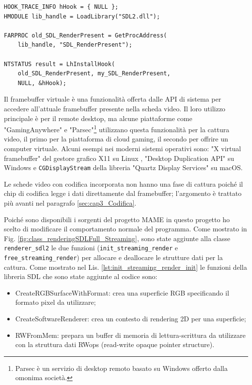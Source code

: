 \begin{lstlisting}[caption=Codice di esempio per hook della libreria SDL, label={lst:hookCode}]
HOOK_TRACE_INFO hHook = { NULL };
HMODULE lib_handle = LoadLibrary("SDL2.dll");

FARPROC old_SDL_RenderPresent =	GetProcAddress(
	lib_handle, "SDL_RenderPresent");

NTSTATUS result = LhInstallHook(
	old_SDL_RenderPresent, my_SDL_RenderPresent,
	NULL, &hHook);
\end{lstlisting}

Il framebuffer virtuale è una funzionalità offerta dalle API di sistema per accedere all'attuale framebuffer presente nella scheda video. Il loro utilizzo principale è per il remote desktop, ma alcune piattaforme come "GamingAnywhere" \parencite{GamingAnywhere} e "Parsec"\footnote{Parsec è un servizio di desktop remoto basato su Windows offerto dalla omonima società.} \parencite{TheTechnologyBehindALowLatencyCloudGamingService} utilizzano questa funzionalità per la cattura video, il primo per la piattaforma di cloud gaming, il secondo per offrire un computer virtuale. Alcuni esempi nei moderni sistemi operativi sono: "X virtual framebuffer" del gestore grafico X11 su Linux \parencite{XVFB}, "Desktop Duplication API" su Windows \parencite{DesktopDuplicationAPI} e \verb|CGDisplayStream| della libreria "Quartz Display Services" su macOS.

Le schede video con codifica incorporata non hanno una fase di cattura poiché il chip di codifica legge i dati direttamente dal framebuffer; l'argomento è trattato più avanti nel paragrafo \ref{sec:cap3_Codifica}.

Poiché sono disponibili i sorgenti del progetto MAME in questo progetto ho scelto di modificare il comportamento normale del programma. Come mostrato in Fig. \ref{fig:class_renderingSDLFull_Streaming}, sono state aggiunte alla classe \verb|renderer_sdl2| le due funzioni (\verb|init_streaming_render| e \verb|free_streaming_render|) per allocare e deallocare le strutture dati per la cattura. Come mostrato nel Lis. \ref{lst:init_streaming_render_init} le funzioni della libreria SDL che sono state aggiunte al codice sono:

\begin{itemize}
	\item CreateRGBSurfaceWithFormat: crea una superficie RGB specificando il formato pixel da utilizzare;	
	\item CreateSoftwareRenderer: crea un contesto di rendering 2D per una superficie;
	\item RWFromMem: prepara un buffer di memoria di lettura-scrittura da utilizzare con la struttura dati RWops (read-write opaque pointer structure).	
\end{itemize}

